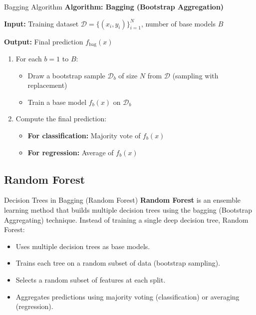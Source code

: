 \documentclass[serif, aspectratio=169]{beamer}
\begin{document}
\begin{frame}{Bagging Algorithm}
    \textbf{Algorithm: Bagging (Bootstrap Aggregation)}
    
    \vspace{0.8em}
    
    \textbf{Input:} Training dataset $\mathcal{D} = \{(x_i, y_i)\}_{i=1}^{N}$, number of base models $B$
    
    \vspace{0.5em}
    \textbf{Output:} Final prediction $f_{\text{bag}}(x)$
    
    \vspace{0.5em}
    \begin{enumerate}
        \item For each $b = 1$ to $B$:
        \begin{itemize}
            \item Draw a bootstrap sample $\mathcal{D}_b$ of size $N$ from $\mathcal{D}$ (sampling with replacement)
            \item Train a base model $f_b(x)$ on $\mathcal{D}_b$
        \end{itemize}
        \item Compute the final prediction:
        \begin{itemize}
            \item \textbf{For classification:} Majority vote of $f_b(x)$
            \item \textbf{For regression:} Average of $f_b(x)$
        \end{itemize}
    \end{enumerate}
\end{frame}

\subsection{Random Forest}

\begin{frame}{Decision Trees in Bagging (Random Forest)}
    \textbf{Random Forest} is an ensemble learning method that builds multiple decision trees using the bagging (Bootstrap Aggregating) technique. Instead of training a single deep decision tree, Random Forest:
    \begin{itemize}
        \item Uses multiple decision trees as base models.
        \item Trains each tree on a random subset of data (bootstrap sampling).
        \item Selects a random subset of features at each split.
        \item Aggregates predictions using majority voting (classification) or averaging (regression).
    \end{itemize}
\end{frame}
\end{document}
